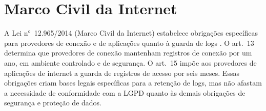\section{Marco Civil da Internet}
\label{sec:marco-civil}

A Lei n°~12.965/2014 (Marco Civil da Internet) estabelece obrigações específicas para provedores de conexão e de aplicações quanto à guarda de logs \cite{brasil2014mci}. O art.\ 13 determina que provedores de conexão mantenham registros de conexão por um ano, em ambiente controlado e de segurança. O art.\ 15 impõe aos provedores de aplicações de internet a guarda de registros de acesso por seis meses. Essas obrigações criam bases legais específicas para a retenção de logs, mas não afastam a necessidade de conformidade com a LGPD quanto às demais obrigações de segurança e proteção de dados.